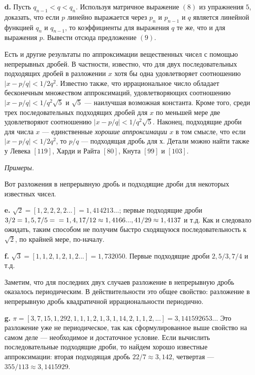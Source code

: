 \documentclass{mai_book}
\begin{document}
\textbf{d.} Пусть $q_{n-1}<q<q_n$. Используя матричное выражение $(8)$ из
упражнения $5$, доказать, что если $p$ линейно выражается через $p_n$ и
$p_{n-1}$ и $q$ является линейной функцией $q_n$ и $q_{n-1}$, то коэффициенты для выражения $q$ те же, что и для выражения $p$. Вывести отсюда 
предложение $(9)$.

\begin{mynotice}
Есть и другие результаты по аппроксимации вещественных чисел
с помощью непрерывных дробей. В частности, известно, что для двух
последовательных подходящих дробей в разложении $x$ хотя бы одна
удовлетворяет соотношению $|x-p/q| < 1/2q^2$. Известно также, что
иррациональное число обладает бесконечным множеством 
аппроксимаций, удовлетворяющих соотношению $|x-p/q| < 1/q^2 \sqrt{5}$ и $\sqrt{5}$ — наилучшая возможная константа. Кроме того, среди трех последовательных подходящих дробей для $x$ по меньшей мере две удовлетворяют 
соотношению $|x-p/q| < 1/q^2 \sqrt{5}$. Наконец, подходящие дроби для числа
$x$ — единственные \textit{хорошие аппроксимации} $x$ в том смысле, что если
$|x-p/q| < 1/2q^2$, то $p/q$ — подходящая дробь для $х$. Детали можно
найти также у Левека $[119]$, Харди и Райта $[80]$, Кнута $[99]$ и $[103]$.
\end{mynotice}

\noindent \textit{Примеры.}

Вот разложения в непрерывную дробь и подходящие дроби для 
некоторых известных чисел.

\textbf{e.} $\sqrt{2} = [1,2,2,2,2...] = 1,414213...$; первые подходящие дроби $3/2 = 1,5, 7/5 = \\ = 1,4, 17/12 \approx 1,4166..., 41/29 \approx 1,4137$ и т.д. Как и следовало ожидать, таким способом не получим быстро сходящуюся
последовательность к $\sqrt{2}$, по крайней мере, по-началу.

\textbf{f.} $\sqrt{3} = [1,1,2,1,2,1,2...] = 1,732050$. Первые подходящие дроби $2, 5/3, 7/4$ и т.д.

Заметим, что для последних двух случаев разложение в непрерывную дробь оказалось периодическим. В действительности это общее свойство: разложение в непрерывную дробь квадратичной иррациональности периодично.

\textbf{g.} $\pi = [3,7,15,1,292,1,1,1,2,1,3,1,14,2,1,1,2,...] = 3,141592653...$ Это разложение уже не периодическое, так как сформулированное 
выше свойство на самом деле — необходимое и достаточное условие. Если вычислить последовательные подходящие дроби, то найдем хорошо известные аппроксимации: вторая подходящая дробь $22/7 \approx 3,142$, 
четвертая — $355/113 \approx 3,1415929$.
\end{document}
